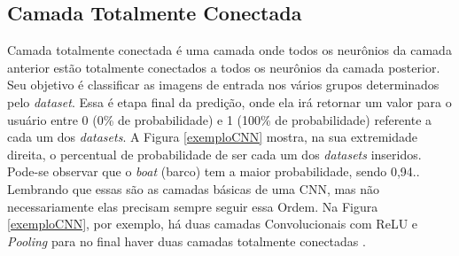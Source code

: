 \subsection{Camada Totalmente Conectada}

Camada totalmente conectada é uma camada onde todos os neurônios da camada anterior estão totalmente conectados a todos os neurônios da camada posterior. Seu objetivo é classificar as imagens de entrada nos vários grupos determinados pelo \textit{dataset}. Essa é etapa final da predição, onde ela irá retornar um valor para o usuário entre 0 (0\% de probabilidade) e 1 (100\% de probabilidade) referente a cada um dos \textit{datasets}. A Figura \ref{exemploCNN} mostra, na sua extremidade direita, o percentual de probabilidade de ser cada um dos \textit{datasets} inseridos. Pode-se observar que o \textit{boat} (barco) tem a maior probabilidade, sendo 0,94.\cite{conv2, aprendizadoDeMaquinaDivertido}. 
Lembrando que essas são as camadas básicas de uma CNN, mas não necessariamente elas precisam sempre seguir essa Ordem. Na Figura \ref{exemploCNN}, por exemplo, há duas camadas Convolucionais com ReLU e \textit{Pooling} para no final haver duas camadas totalmente conectadas \cite{conv2}.

\begin{figure}[H]
	\centering
\end{figure}
